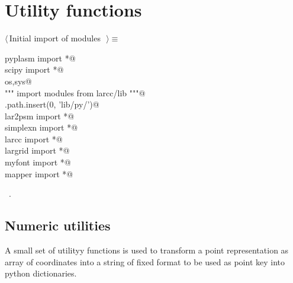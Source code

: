 \documentclass[11pt,oneside]{article}	%
\begin{document}
\section{Utility functions}
\begin{flushleft} \small \label{scrap26}
$\langle\,$Initial import of modules\nobreak\ {\footnotesize {}}$\,\rangle\equiv$
\vspace{-1ex}
\begin{list}{}{} \item
\mbox{}\verb@from pyplasm import *@\\
\mbox{}\verb@from scipy import *@\\
\mbox{}\verb@import os,sys@\\
\mbox{}\verb@""" import modules from larcc/lib """@\\
\mbox{}\verb@sys.path.insert(0, 'lib/py/')@\\
\mbox{}\verb@from lar2psm import *@\\
\mbox{}\verb@from simplexn import *@\\
\mbox{}\verb@from larcc import *@\\
\mbox{}\verb@from largrid import *@\\
\mbox{}\verb@from myfont import *@\\
\mbox{}\verb@from mapper import *@\\
\mbox{}\verb@@{\NWsep}
\end{list}
\vspace{-1ex}
\footnotesize\addtolength{\baselineskip}{-1ex}
\begin{list}{}{\setlength{\itemsep}{-\parsep}\setlength{\itemindent}{-\leftmargin}}
\item \NWtxtMacroRefIn\ .
\end{list}
\end{flushleft}
\subsection{Numeric utilities}

A small set of utilityy functions is used to transform a point representation as array of coordinates into a string of fixed format to be used as point key into python dictionaries.
\end{document}
